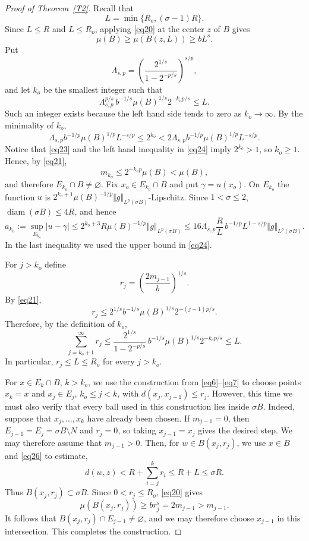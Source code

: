 \documentclass[12pt,leqno]{amsart}
\theoremstyle{definition}
\def\diam{\operatorname{diam}}
\numberwithin{theorem}{section} \numberwithin{equation}{section}
\begin{document}
\begin{proof}[Proof of Theorem~\ref{T2}]
Recall that
\[
 L=\min\{R_o,(\sigma-1)R\}.
\]
Since $L\leq R$ and $L\leq R_o$, applying \eqref{eq20} at the center $z$ of $B$ gives
\begin{equation}
\label{eq23}
 \mu(B)\geq\mu(B(z,L))\geq bL^s.
\end{equation}
Put
\[
 \Lambda_{s,p}=\left(\frac{2^{1/s}}{1-2^{-p/s}}\right)^{s/p},
\]
and let $k_o$ be the smallest integer such that
\[
 \Lambda_{s,p}^{p/s}\,
 b^{-1/s}\mu(B)^{1/s}2^{-k_op/s}\leq L.
\]
Such an integer exists because the left hand side tends to zero as $k_o\to\infty$. By the minimality of $k_o$,
\begin{equation}
\label{eq24}
 \Lambda_{s,p}b^{-1/p}\mu(B)^{1/p}L^{-s/p}
 \leq2^{k_o}
 <2\Lambda_{s,p}b^{-1/p}\mu(B)^{1/p}L^{-s/p}.
\end{equation}
Notice that \eqref{eq23} and the left hand inequality in \eqref{eq24} imply $2^{k_o}>1$, so $k_o\geq1$. Hence, by \eqref{eq21},
\[
 m_{k_o}\leq2^{-k_op}\mu(B)<\mu(B),
\]
and therefore $E_{k_o}\cap B\ne\varnothing$. Fix $x_o\in E_{k_o}\cap B$ and put $\gamma=u(x_o)$. On $E_{k_o}$ the function $u$ is
$2^{k_o+1}\mu(B)^{-1/p}\Vert g\Vert_{L^p(\sigma B)}$-Lipschitz. Since $1<\sigma\leq2$,
$\diam(\sigma B)\leq4R$, and hence
\begin{equation}
\label{eq25}
 a_{k_o}:=\sup_{E_{k_o}}|u-\gamma|
 \leq2^{k_o+3}R\mu(B)^{-1/p}\Vert g\Vert_{L^p(\sigma B)}
 \leq 16\Lambda_{s,p}\frac RL\,b^{-1/p}L^{1-s/p}
 \Vert g\Vert_{L^p(\sigma B)}.
\end{equation}
In the last inequality we used the upper bound in \eqref{eq24}.

For $j>k_o$ define
\[
 r_j=\left(\frac{2m_{j-1}}b\right)^{1/s}.
\]
By \eqref{eq21},
\[
 r_j\leq2^{1/s}b^{-1/s}\mu(B)^{1/s}2^{-(j-1)p/s}.
\]
Therefore, by the definition of $k_o$,
\begin{equation}
\label{eq26}
 \sum_{j=k_o+1}^{\infty}r_j
 \leq\frac{2^{1/s}}{1-2^{-p/s}}\,
 b^{-1/s}\mu(B)^{1/s}2^{-k_op/s}
 \leq L.
\end{equation}
In particular, $r_j\leq L\leq R_o$ for every $j>k_o$.

For $x\in E_k\cap B$, $k>k_o$, we use the construction from
\eqref{eq6}--\eqref{eq7} to choose points $x_k=x$ and $x_j\in E_j$,
$k_o\leq j<k$, with $d(x_j,x_{j-1})\leq r_j$. However, this time we must also verify that every ball used in this construction lies inside $\sigma B$.
Indeed, suppose that $x_j,\ldots,x_k$ have already been chosen. 
If $m_{j-1}=0$, then
$E_{j-1}=E_j=\sigma B\setminus N$ and $r_j=0$, so taking
$x_{j-1}=x_j$ gives the desired step. We may therefore assume
that $m_{j-1}>0$. Then, for $w\in B(x_j,r_j)$, we use $x\in B$ and \eqref{eq26} to estimate,
\[
 d(w,z)<R+\sum_{i=j}^k r_i\leq R+L\leq\sigma R.
\]
Thus $B(x_j,r_j)\subset\sigma B$. Since $0<r_j\leq R_o$, \eqref{eq20} gives
\[
 \mu(B(x_j,r_j))\geq br_j^s=2m_{j-1}>m_{j-1}.
\]
It follows that $B(x_j,r_j)\cap E_{j-1}\neq\varnothing$, and we may therefore choose $x_{j-1}$ in this intersection. This completes the construction.



\end{proof}
\end{document}
